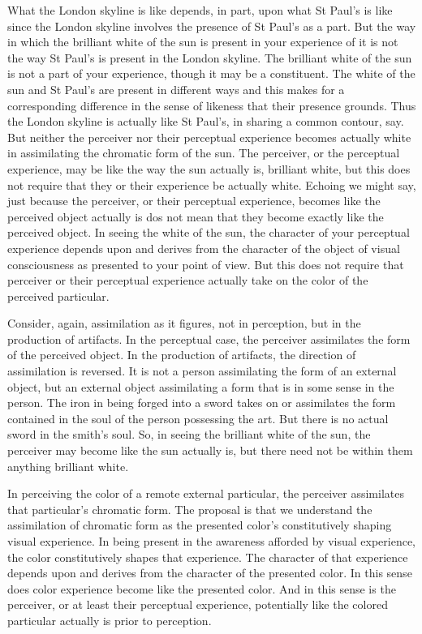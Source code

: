 What the London skyline is like depends, in part, upon what St Paul's is like since the London skyline involves the presence of St Paul's as a part. But the way in which the brilliant white of the sun is present in your experience of it is not the way St Paul's is present in the London skyline. The brilliant white of the sun is not a part of your experience, though it may be a constituent. The white of the sun and St Paul's are present in different ways and this makes for a corresponding difference in the sense of likeness that their presence grounds. Thus the London skyline is actually like St Paul's, in sharing a common contour, say. But neither the perceiver nor their perceptual experience becomes actually white in assimilating the chromatic form of the sun. The perceiver, or the perceptual experience, may be like the way the sun actually is, brilliant white, but this does not require that they or their experience be actually white. Echoing \citet{Austin:1962lr} we might say, just because the perceiver, or their perceptual experience, becomes like the perceived object actually is dos not mean that they become exactly like the perceived object. In seeing the white of the sun, the character of your perceptual experience depends upon and derives from the character of the object of visual consciousness as presented to your point of view. But this does not require that perceiver or their perceptual experience actually take on the color of the perceived particular.

Consider, again, assimilation as it figures, not in perception, but in the production of artifacts. In the perceptual case, the perceiver assimilates the form of the perceived object. In the production of artifacts, the direction of assimilation is reversed. It is not a person assimilating the form of an external object, but an external object assimilating a form that is in some sense in the person. The iron in being forged into a sword takes on or assimilates the form contained in the soul of the person possessing the art.  But there is no actual sword in the smith’s soul. So, in seeing the brilliant white of the sun, the perceiver may become like the sun actually is, but there need not be within them anything brilliant white.

In perceiving the color of a remote external particular, the perceiver assimilates that particular's chromatic form. The proposal is that we understand the assimilation of chromatic form as the presented color's constitutively shaping visual experience. In being present in the awareness afforded by visual experience, the color constitutively shapes that experience. The character of that experience depends upon and derives from the character of the presented color. In this sense does color experience become like the presented color. And in this sense is the perceiver, or at least their perceptual experience, potentially like the colored particular actually is prior to perception.


